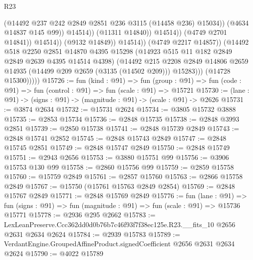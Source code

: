 \begin{lexlean}{R23}
\begin{coremodule}
                                          (@14492
                                            @237
                                            @242
                                            @2849
                                            @2851
                                            @236
                                            @3115
                                            (@14458 @236)
                                            @15034))
                                        (@4634 @14837 @145 @99))
                                      @14514))
                                  (@11311 @14840))
                                @14514))
                            (@4749 @2701 @14841))
                          @14514))
                      (@9132 @14849))
                    @14514))
                (@4749 @2217 @14857))
              (@14492
                @518
                @2250
                @2851
                @14870
                @4395
                @15298
                (@14923 @515 @11 @182 @2849 @2849 @2639 @4395 @14514 @4398)
                (@14492
                  @215
                  @2208
                  @2849
                  @14806
                  @2659
                  @14935
                  (@14499 @209 @2659 (@3135 (@14502 @209)))
                  @15283)))
            (@14728 @15300)))))
@15726 := fun (kind : @91) =>
  fun (group : @91) => fun (code : @91) => fun (control : @91) => fun (scale : @91) => @15721
@15730 := (lane : @91) -> (signs : @91) -> (magnitude : @91) -> (scale : @91) -> @2626
@15731 := @3874 @2634
@15732 := @15731 @2624
@15734 := @3805 @15732 @3888
@15735 := @2853 @15734
@15736 := @2848 @15735
@15738 := @2848 @3993 @2851
@15739 := @2850 @15738
@15741 := @2848 @15739 @2849
@15743 := @2848 @15741 @2852
@15745 := @2848 @15743 @2849
@15747 := @2848 @15745 @2851
@15749 := @2848 @15747 @2849
@15750 := @2848 @15749
@15751 := @2943 @2656
@15753 := @3880 @15751 @99
@15756 := @3906 @15753 @130 @99
@15758 := @2860 @15756 @99
@15759 := @2859 @15758
@15760 := @15759 @2849
@15761 := @2857 @15760
@15763 := @2866 @15758 @2849
@15767 := @15750 (@15761 @15763 @2849 @2854)
@15769 := @2848 @15767 @2849
@15771 := @2848 @15769 @2849
@15776 := fun (lane : @91) =>
  fun (signs : @91) => fun (magnitude : @91) => fun (scale : @91) => @15736 @15771
@15778 := @2936 @295 @2662
@15783 := LexLeanPreserve.Ccc362dd0d0b76b7c46f93f7f38ec125e.R23.__fits_10 @2656 @2631 @2634 @2624
@15784 := @2939 @15783
@15789 := VerdantEngine.GroupedAffineProduct.signedCoefficient @2656 @2631 @2634 @2624
@15790 := @4022 @15789

\end{coremodule}
\end{lexlean}
